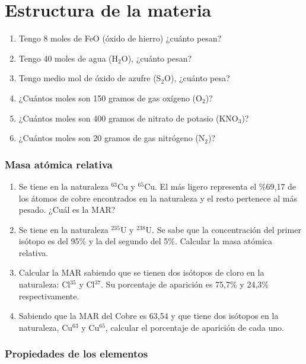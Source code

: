 \section{Estructura de la materia}

\begin{enumerate}
\item Tengo 8 moles de FeO (óxido de hierro) ¿cuánto pesan? 
\item Tengo 40 moles de agua (H$_2$O), ¿cuánto pesan? 
\item Tengo medio mol de óxido de azufre (S$_2$O), ¿cuánto pesa? 
\item ¿Cuántos moles son 150 gramos de gas oxígeno (O$_2$)? 
\item ¿Cuántos moles son 400 gramos de nitrato de potasio (KNO$_3$)?
\item ¿Cuántos moles son 20 gramos de gas nitrógeno (N$_2$)?
\end{enumerate}

\subsubsection*{Masa atómica relativa}

\begin{enumerate}
\item Se tiene en la naturaleza $^{63}$Cu y $^{65}$Cu. El más ligero representa el \%69,17 de los átomos de cobre encontrados en la naturaleza y el resto pertenece al más pesado. ¿Cuál es la MAR?

\item Se tiene en la naturaleza $^{235}$U y $^{238}$U. Se sabe que la concentración del primer isótopo es del 95\% y la del segundo del 5\%. Calcular la masa atómica relativa.

\item Calcular la MAR sabiendo que se tienen dos isótopos de cloro en la naturaleza: Cl$^{35}$ y Cl$^{37}$. Su porcentaje de aparición es 75,7\% y 24,3\% respectivamente.

\item Sabiendo que la MAR del Cobre es 63,54 y que tiene dos isótopos en la naturaleza, Cu$^{63}$ y Cu$^{65}$, calcular el porcentaje de aparición de cada uno.
\end{enumerate}


\subsubsection*{Propiedades de los elementos}

